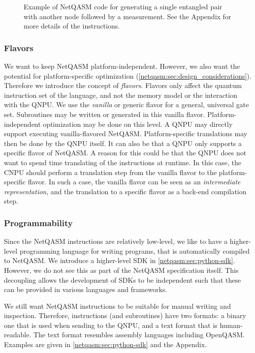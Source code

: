 \begin{figure}[t]
      \centering
      \begin{minipage}{\textwidth}
            
      \end{minipage}
      \caption{Example of NetQASM code for generating a single entangled pair with another node followed by a measurement.
            See the Appendix for more details of the instructions.}
      \label{netqasm:fig:nqasm_code_example}
\end{figure}

\subsubsection{Flavors}
\label{netqasm:sec:design_decisions_flavors}
We want to keep \ac{NetQASM} platform-independent.
However, we also want the potential for platform-specific optimization (\cref{netqasm:sec:design_considerations}).
Therefore we introduce the concept of \textit{flavors}.
Flavors only affect the quantum instruction set of the language, and not the memory model or the interaction with the \ac{QNPU}.
We use the \textit{vanilla} or generic flavor for a general, universal gate set.
Subroutines may be written or generated in this vanilla flavor.
Platform-independent optimization may be done on this level.
A \ac{QNPU} may directly support executing vanilla-flavored \ac{NetQASM}.
Platform-specific translations may then be done by the \ac{QNPU} itself.
It can also be that a \ac{QNPU} only supports a specific flavor of \ac{NetQASM}.
A reason for this could be that the \ac{QNPU} does not want to spend time translating of the instructions at runtime.
In this case, the \ac{CNPU} should perform a translation step from the vanilla flavor to the platform-specific flavor.
In such a case, the vanilla flavor can be seen as an \textit{intermediate representation}, and the translation to a specific flavor as a back-end compilation step.

\subsubsection{Programmability}
Since the \ac{NetQASM} instructions are relatively low-level, we like to have a higher-level programming language for writing programs, that is automatically compiled to \ac{NetQASM}.
We introduce a higher-level SDK in \cref{netqasm:sec:python-sdk}.
However, we do not see this as part of the \ac{NetQASM} specification itself.
This decoupling allows the development of SDKs to be independent such that these can be provided in various languages and frameworks.

We still want \ac{NetQASM} instructions to be suitable for manual writing and inspection.
Therefore, instructions (and subroutines) have two formats: a binary one that is used when sending to the \ac{QNPU}, and a text format that is human-readable.
The text format resembles assembly languages including OpenQASM.
Examples are given in \cref{netqasm:sec:python-sdk} and the Appendix.
